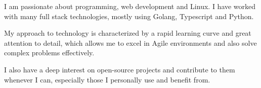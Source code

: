

\begin{cvparagraph}

I am passionate about programming, web development
and Linux.
I have worked with many full stack technologies, mostly using
Golang, Typescript and Python.
\end{cvparagraph}

\begin{cvparagraph}
My approach to technology is characterized by a rapid learning curve and great attention to detail, which allows me to excel in Agile environments and also solve complex problems effectively.
\end{cvparagraph}

\begin{cvparagraph}

I also have a deep interest on open-source projects and contribute to them whenever I can, especially those I personally use and benefit from.


\end{cvparagraph}